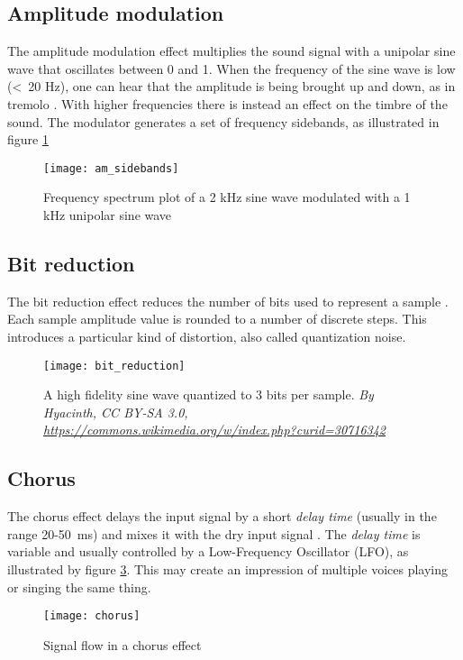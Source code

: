 \subsection{Amplitude modulation}
The amplitude modulation effect multiplies the sound signal with a unipolar sine wave that oscillates between 0 and 1. When the frequency of the sine wave is low (\textless~20 Hz), one can hear that the amplitude is being brought up and down, as in tremolo \citep{serafin2007}. With higher frequencies there is instead an effect on the timbre of the sound. The modulator generates a set of frequency sidebands, as illustrated in figure \ref{fig:am_sidebands}

\begin{figure}[h]
    \centering
    \texttt{[image: am\_sidebands]}
    \caption{Frequency spectrum plot of a 2 kHz sine wave modulated with a 1 kHz unipolar sine wave}
    \label{fig:am_sidebands}
\end{figure}

\subsection{Bit reduction}
The bit reduction effect reduces the number of bits used to represent a sample \citep{bitreduction}. Each sample amplitude value is rounded to a number of discrete steps. This introduces a particular kind of distortion, also called quantization noise.

\begin{figure}[h]
    \centering
    \texttt{[image: bit\_reduction]}
    \caption{A high fidelity sine wave quantized to 3 bits per sample. \textit{By Hyacinth, CC BY-SA 3.0, \url{https://commons.wikimedia.org/w/index.php?curid=30716342}}}
    \label{fig:bit_reduction}
\end{figure}

\subsection{Chorus}
The chorus effect delays the input signal by a short \textit{delay time} (usually in the range 20-50~ms) and mixes it with the dry input signal \citep{chorus}. The \textit{delay time} is variable and usually controlled by a Low-Frequency Oscillator (LFO), as illustrated by figure \ref{fig:chorus}. This may create an impression of multiple voices playing or singing the same thing.

\begin{figure}[h]
    \centering
    \texttt{[image: chorus]}
    \caption{Signal flow in a chorus effect}
    \label{fig:chorus}
\end{figure}


